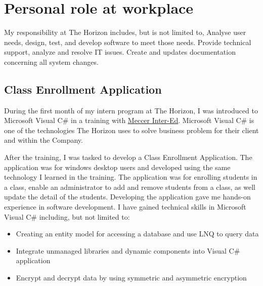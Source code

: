 \documentclass[paper=a4, fontsize=12pt]{scrartcl}
\numberwithin{equation}{section}		%
\numberwithin{figure}{section}			%
\numberwithin{table}{section}				%
\begin{document}

\section{\textbf{Personal role at workplace} }
My responsibility at The Horizon includes, but is not limited to, Analyse user needs, design, test, and develop software to meet those needs. Provide technical support, analyze and resolve IT issues. Create and updates documentation concerning all system changes.

\subsection{Class Enrollment Application}
During the first month of my intern program at The Horizon, I was introduced to Microsoft Visual C\# in a training with \href{https://mecerintered.co.za/}{Meccer Inter-Ed}. Microsoft Visual C\# is one of the technologies The Horizon uses to solve business problem for their client and within the Company.

After the training, I was tasked to develop a Class Enrollment Application. The application was for windows desktop users and developed using the same technology I learned in the training. The application was for enrolling students in a class, enable an administrator to add and remove students from a class, as well update the detail of the students. Developing the application gave me hands-on experience in software development. I have gained technical skills in Microsoft Visual C\# including, but not limited to:
\begin{itemize}[noitemsep,partopsep=0pt,topsep=0pt,parsep=0pt]
	\item Creating an entity model for accessing a database and use LNQ to query data
	\item Integrate unmanaged libraries and dynamic components into Visual C\# application
	\item Encrypt and decrypt data by using symmetric and asymmetric encryption
\end{itemize}
\end{document}
